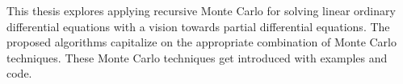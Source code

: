 This thesis explores applying recursive Monte Carlo
for solving linear
ordinary differential equations with a vision towards
partial differential equations.
The proposed algorithms capitalize on the appropriate
combination of Monte Carlo techniques.
These Monte Carlo techniques get introduced with examples
and code.
